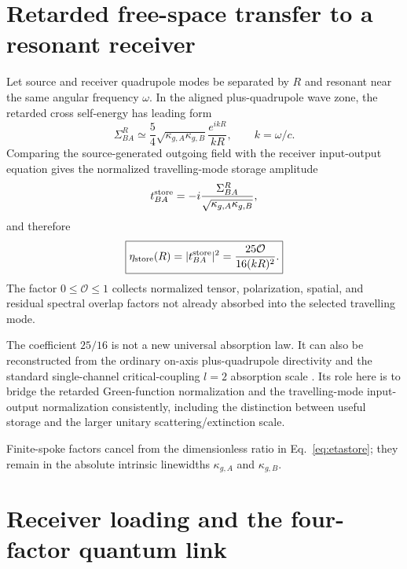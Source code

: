 \documentclass[11pt]{article}
\begin{document}
\section{Retarded free-space transfer to a resonant receiver}
\label{sec:propagation}

Let source and receiver quadrupole modes be separated by $R$ and resonant near the same angular frequency $\omega$. In the aligned plus-quadrupole wave zone, the retarded cross self-energy has leading form
\begin{equation}
\boxed{
\Sigma_{BA}^R
\simeq
\frac54
\sqrt{\kappa_{g,A}\kappa_{g,B}}
\frac{e^{ikR}}{kR},
\qquad k=\omega/c.
}
\label{eq:Sigmafar}
\end{equation}
Comparing the source-generated outgoing field with the receiver input-output equation gives the normalized travelling-mode storage amplitude
\begin{equation}
 t_{BA}^{\rm store}
=-i\frac{\Sigma_{BA}^R}
{\sqrt{\kappa_{g,A}\kappa_{g,B}}},
\end{equation}
and therefore
\begin{equation}
\boxed{
\eta_{\rm store}(R)
=|t_{BA}^{\rm store}|^2
=\frac{25\mathcal O}{16(kR)^2}.
}
\label{eq:etastore}
\end{equation}
The factor $0\le\mathcal O\le1$ collects normalized tensor, polarization, spatial, and residual spectral overlap factors not already absorbed into the selected travelling mode.

The coefficient $25/16$ is not a new universal absorption law. It can also be reconstructed from the ordinary on-axis plus-quadrupole directivity and the standard single-channel critical-coupling $l=2$ absorption scale \cite{RuanFan2012,TobarEtAl2024}. Its role here is to bridge the retarded Green-function normalization and the travelling-mode input-output normalization consistently, including the distinction between useful storage and the larger unitary scattering/extinction scale.

Finite-spoke factors cancel from the dimensionless ratio in Eq.~\eqref{eq:etastore}; they remain in the absolute intrinsic linewidths $\kappa_{g,A}$ and $\kappa_{g,B}$.

\section{Receiver loading and the four-factor quantum link}
\label{sec:receiver}
\end{document}
